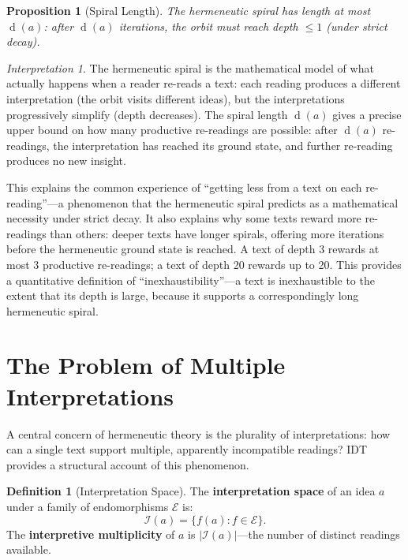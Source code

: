 \documentclass[11pt,openany]{book}
\theoremstyle{definition}
\newtheorem{definition}[axiom]{Definition}
\theoremstyle{plain}
\newtheorem{proposition}[axiom]{Proposition}
\theoremstyle{remark}
\newtheorem{interpretation}[axiom]{Interpretation}
\newcommand{\depth}{\operatorname{d}}       %
\begin{document}
\begin{proposition}[Spiral Length]
The hermeneutic spiral has length at most $\depth(a)$: after $\depth(a)$ iterations, the orbit must reach depth $\leq 1$ (under strict decay).
\end{proposition}

\begin{interpretation}
The hermeneutic spiral is the mathematical model of what actually happens when a reader re-reads a text: each reading produces a different interpretation (the orbit visits different ideas), but the interpretations progressively simplify (depth decreases). The spiral length $\depth(a)$ gives a precise upper bound on how many productive re-readings are possible: after $\depth(a)$ re-readings, the interpretation has reached its ground state, and further re-reading produces no new insight.

This explains the common experience of ``getting less from a text on each re-reading''---a phenomenon that the hermeneutic spiral predicts as a mathematical necessity under strict decay. It also explains why some texts reward more re-readings than others: deeper texts have longer spirals, offering more iterations before the hermeneutic ground state is reached. A text of depth 3 rewards at most 3 productive re-readings; a text of depth 20 rewards up to 20. This provides a quantitative definition of ``inexhaustibility''---a text is inexhaustible to the extent that its depth is large, because it supports a correspondingly long hermeneutic spiral.
\end{interpretation}

\section{The Problem of Multiple Interpretations}

A central concern of hermeneutic theory is the plurality of interpretations: how can a single text support multiple, apparently incompatible readings? IDT provides a structural account of this phenomenon.

\begin{definition}[Interpretation Space]
The \textbf{interpretation space} of an idea $a$ under a family of endomorphisms $\mathcal{E}$ is:
\[
\mathcal{I}(a) = \{f(a) : f \in \mathcal{E}\}.
\]
The \textbf{interpretive multiplicity} of $a$ is $|\mathcal{I}(a)|$---the number of distinct readings available.
\end{definition}
\end{document}
